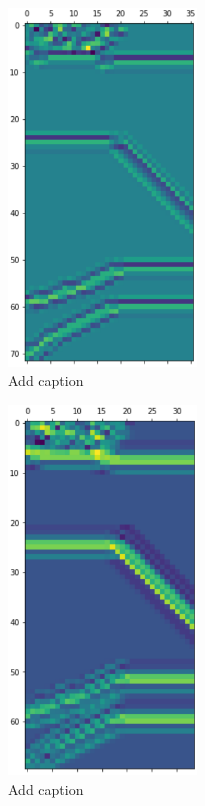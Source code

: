 \begin{minipage}{0.5\textwidth}
	\begin{figure}[H]
		\centering
		\includegraphics[width=5cm]{images/2dcnnLayer1.png}
		\caption[Bild kurz]{Add caption}
		\label{fig:vis2d1}
	\end{figure}
\end{minipage}
\begin{minipage}{0.5\textwidth}
	\begin{figure}[H]
		\centering
		\includegraphics[width=5cm]{images/2dcnnLayer2.png}
		\caption[Bild kurz]{Add caption}
		\label{fig:vis2d2}
	\end{figure}
\end{minipage}

